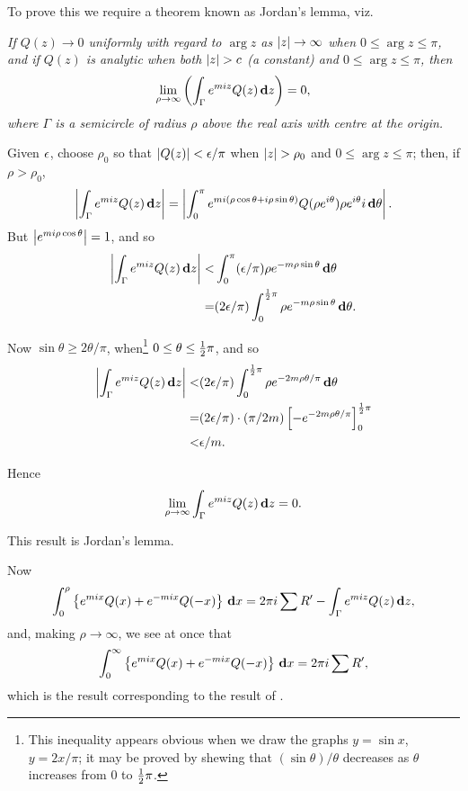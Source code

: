To prove this we require a theorem known as Jordan's lemma, viz.

\emph{If $Q(z) \rightarrow 0$ uniformly with regard to $\arg z$ as
  $\left| z \right| \rightarrow \infty$ when $0 \leq \arg z \leq \pi$,
  and if $Q(z)$ is analytic when both $\left| z \right| > c$ (a constant)
  and $0 \leq \arg z \leq \pi$, then
  $$
  \lim_{\rho\rightarrow\infty}
  \left(  \int_{\Gamma} e^{miz} Q(z) \, \mathbf{d} z   \right)
  =
  0,
  $$
  where $\Gamma$ is a semicircle of radius $\rho$ above the real axis with centre at
  the origin.}

Given $\epsilon$, choose $\rho_{0}$ so that $\left| Q(z) \right| < \epsilon/\pi$
when $\left| z \right| > \rho_{0}$ and
$0 \leq \arg z \leq \pi$;
then, if $\rho > \rho_{0}$,
$$
\left|  \int_{\Gamma} e^{miz} Q(z) \, \mathbf{d} z  \right|
=
\left| 
  \int_{0}^{\pi}
  e^{mi (\rho \cos\theta + i\rho \sin\theta)}
  Q(\rho e^{i\theta})
  \rho e^{i \theta}
  i \, \mathbf{d} \theta
 \right|.
$$
But $\left|  e^{mi\rho\cos\theta}  \right| = 1$, and so
\begin{align*}
  \left|  \int_{\Gamma} e^{miz} Q(z) \, \mathbf{d} z  \right|
  <&
  \int_{0}^{\pi} (\epsilon/\pi) \rho e^{-m\rho\sin\theta} \, \mathbf{d}\theta
  \\
  =&
  (2\epsilon/\pi)
  \int_{0}^{\frac{1}{2}\pi} \rho e^{-m\rho\sin\theta} \, \mathbf{d}\theta.
\end{align*}

Now $\sin\theta \geq 2\theta/\pi$, when\footnote{This inequality
  appears obvious when we draw the graphs $y = \sin x$, $y = 2x/\pi$;
  it may be proved by shewing that $(\sin\theta)/\theta$ decreases as
  $\theta$ increases from $0$ to $\frac{1}{2}\pi$.
} $0 \leq \theta \leq \frac{1}{2}\pi$, and so
\begin{align*}
  \left|  \int_{\Gamma} e^{miz} Q(z) \, \mathbf{d} z  \right|
  <&
  (2\epsilon/\pi)
  \int_{0}^{\frac{1}{2}\pi}
  \rho e^{-2m\rho\theta/\pi} \, \mathbf{d}\theta
  \\
  =&
  (2\epsilon/\pi) \cdot (\pi/2m)
  \left[  -e^{-2m\rho\theta/\pi}  \right]_{0}^{\frac{1}{2}\pi}
  \\
  <&
  \epsilon/m.
\end{align*}

%
%

Hence
$$
\lim_{\rho\rightarrow\infty} \int_{\Gamma} e^{miz} Q(z) \, \mathbf{d} z = 0.
$$

This result is Jordan's lemma.

Now
$$
\int_{0}^{\rho}
\left\{ 
  e^{mix} Q(x) + e^{-mix} Q(-x)
 \right\}
\, \mathbf{d} x
=
2 \pi i \sum R'
-
\int_{\Gamma} e^{miz} Q(z) \, \mathbf{d} z,
$$
and, making $\rho\rightarrow\infty$, we see at once that
$$
\int_{0}^{\infty}
\left\{ 
  e^{mix} Q(x) + e^{-mix} Q(-x)
 \right\}
\, \mathbf{d} x
=
2 \pi i \sum R',
$$
which is the result corresponding to the result of .

